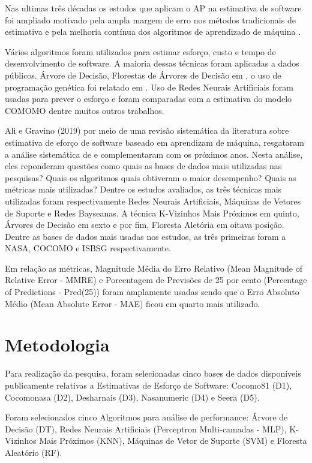 \documentclass[12pt]{article}
\begin{document}
Nas ultimas três décadas os estudos que aplicam o AP na estimativa de software foi ampliado motivado pela ampla margem de erro nos métodos tradicionais de estimativa e pela melhoria contínua dos algoritmos de aprendizado de máquina \cite{banimustafa:2018}.

Vários algoritmos foram utilizados para estimar esforço, custo e tempo de desenvolvimento de software. A maioria dessas técnicas foram aplicadas a dados públicos. Árvore de Decisão, Florestas de Árvores de Decisão em \cite{nassifetal:2013}, o uso de programação genética foi relatado em \cite{chavoyaetal:2012}. Uso de Redes Neurais Artificiais foram usadas para prever o esforço e foram comparadas com a estimativa do modelo COMOMO \cite{trontoetal:2007, bhatiaattri:2015} dentre muitos outros trabalhos.

Ali e Gravino (2019) por meio de uma revisão sistemática da literatura sobre estimativa de eforço de software baseado em aprendizam de máquina, resgataram a análise sistemática de \cite{wen:2012} e complementaram com os próximos anos. Nesta análise, eles reponderam questões como quais as bases de dados mais utilizadas nas pesquisas? Quais os algoritmos quais obtiveram o maior desempenho? Quais as métricas mais utilizadas? Dentre os estudos avaliados, as três técnicas mais utilizadas foram respectivamente Redes Neurais Artificiais, Máquinas de Vetores de Suporte e Redes Bayseanas. A técnica K-Vizinhos Mais Próximos em quinto, Árvores de Decisão em sexto e por fim, Floresta Aletória em oitava posição. Dentre as bases de dados mais usadas nos estudos, as três primeiras foram a NASA, COCOMO e ISBSG respectivamente.

Em relação as métricas, Magnitude Média do Erro Relativo (Mean Magnitude of Relative Error - MMRE) e Porcentagem de Previsões de 25 por cento (Percentage of Predictions - Pred(25)) foram amplamente usadas sendo que o Erro Absoluto Médio (Mean Absolute Error - MAE) ficou em quarto mais utilizado.

\section{Metodologia}

Para realização da pesquisa, foram selecionadas cinco bases de dados disponíveis publicamente  relativas a Estimativas de Esforço de Software: Cocomo81 (D1), Cocomonasa (D2), Desharnais (D3), Nasanumeric (D4) e Seera (D5)\cite{promise:2005, nasanumeric:2014, seera:2020}.

Foram selecionados cinco Algoritmos para análise de performance: Árvore de Decisão (DT), Redes Neurais Artificiais (Perceptron Multi-camadas - MLP), K-Vizinhos Mais Próximos (KNN), Máquinas de Vetor de Suporte (SVM) e Floresta Aleatório (RF).
\end{document}
